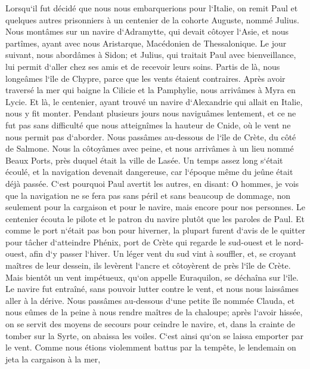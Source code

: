 \verse Lorsqu`il fut décidé que nous nous embarquerions pour l`Italie, on remit Paul et quelques autres prisonniers à un centenier de la cohorte Auguste, nommé Julius. 
\verse Nous montâmes sur un navire d`Adramytte, qui devait côtoyer l`Asie, et nous partîmes, ayant avec nous Aristarque, Macédonien de Thessalonique. 
\verse Le jour suivant, nous abordâmes à Sidon; et Julius, qui traitait Paul avec bienveillance, lui permit d`aller chez ses amis et de recevoir leurs soins. 
\verse Partis de là, nous longeâmes l`île de Chypre, parce que les vents étaient contraires. 
\verse Après avoir traversé la mer qui baigne la Cilicie et la Pamphylie, nous arrivâmes à Myra en Lycie. 
\verse Et là, le centenier, ayant trouvé un navire d`Alexandrie qui allait en Italie, nous y fit monter. 
\verse Pendant plusieurs jours nous naviguâmes lentement, et ce ne fut pas sans difficulté que nous atteignîmes la hauteur de Cnide, où le vent ne nous permit pas d`aborder. Nous passâmes au-dessous de l`île de Crète, du côté de Salmone. 
\verse Nous la côtoyâmes avec peine, et nous arrivâmes à un lieu nommé Beaux Ports, près duquel était la ville de Lasée. 
\verse Un temps assez long s`était écoulé, et la navigation devenait dangereuse, car l`époque même du jeûne était déjà passée. 
\verse C`est pourquoi Paul avertit les autres, en disant: O hommes, je vois que la navigation ne se fera pas sans péril et sans beaucoup de dommage, non seulement pour la cargaison et pour le navire, mais encore pour nos personnes. 
\verse Le centenier écouta le pilote et le patron du navire plutôt que les paroles de Paul. 
\verse Et comme le port n`était pas bon pour hiverner, la plupart furent d`avis de le quitter pour tâcher d`atteindre Phénix, port de Crète qui regarde le sud-ouest et le nord-ouest, afin d`y passer l`hiver. 
\verse Un léger vent du sud vint à souffler, et, se croyant maîtres de leur dessein, ils levèrent l`ancre et côtoyèrent de près l`île de Crète. 
\verse Mais bientôt un vent impétueux, qu`on appelle Euraquilon, se déchaîna sur l`île. 
\verse Le navire fut entraîné, sans pouvoir lutter contre le vent, et nous nous laissâmes aller à la dérive. 
\verse Nous passâmes au-dessous d`une petite île nommée Clauda, et nous eûmes de la peine à nous rendre maîtres de la chaloupe; 
\verse après l`avoir hissée, on se servit des moyens de secours pour ceindre le navire, et, dans la crainte de tomber sur la Syrte, on abaissa les voiles. C`est ainsi qu`on se laissa emporter par le vent. 
\verse Comme nous étions violemment battus par la tempête, le lendemain on jeta la cargaison à la mer, 
